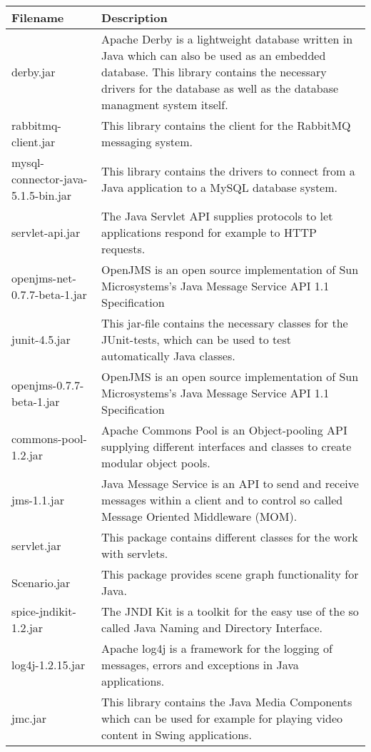 \begin{center}
\begin{longtable}{|p{}|p{}|}
\hline 
Filename & Description\\
\hline
\hline 
derby.jar & Apache Derby is a lightweight database written in Java which can also be used as an embedded database. This library contains the necessary drivers for the database as well as the database managment system itself.\\
\hline 
rabbitmq-client.jar & This library contains the client for the RabbitMQ messaging system.\\
\hline 
mysql-connector-java-5.1.5-bin.jar & This library contains the drivers to connect from a Java application to a MySQL database system.\\
\hline 
servlet-api.jar & The Java Servlet API supplies protocols to let applications respond for example to HTTP requests.\\
\hline 
openjms-net-0.7.7-beta-1.jar & OpenJMS is an open source implementation of Sun Microsystems's Java Message Service API 1.1 Specification\\
\hline 
junit-4.5.jar & This jar-file contains the necessary classes for the JUnit-tests, which can be used to test automatically Java classes.\\
\hline 
openjms-0.7.7-beta-1.jar & OpenJMS is an open source implementation of Sun Microsystems's Java Message Service API 1.1 Specification\\
\hline 
commons-pool-1.2.jar & Apache Commons Pool is an Object-pooling API supplying different interfaces and classes to create modular object pools.\\
\hline 
jms-1.1.jar & Java Message Service is an API to send and receive messages within a client and to control so called Message Oriented Middleware (MOM).\\
\hline 
servlet.jar & This package contains different classes for the work with servlets.\\
\hline 
Scenario.jar & This package provides scene graph functionality for Java.\\
\hline 
spice-jndikit-1.2.jar & The JNDI Kit is a toolkit for the easy use of the so called Java Naming and Directory Interface.\\
\hline 
log4j-1.2.15.jar & Apache log4j is a framework for the logging of messages, errors and exceptions in Java applications.\\
\hline 
jmc.jar & This library contains the Java Media Components which can be used for example for playing video content in Swing applications.\\

\end{longtable}
\end{center}
